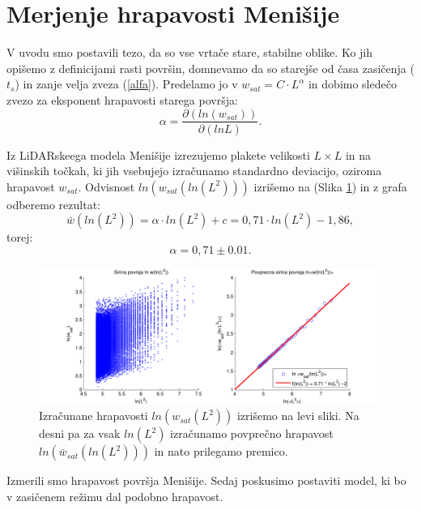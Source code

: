 \documentclass[a4paper, twoside, 12pt]{book}
\begin{document}
\section{Merjenje hrapavosti Menišije}
\label{hrapavost}

V uvodu smo postavili tezo, da so vse vrtače stare, stabilne oblike. Ko jih opišemo z definicijami rasti površin, domnevamo da so starejše od časa zasičenja ($t_s$) in zanje velja zveza (\ref{alfa}). Predelamo jo v $ w_{sat}=C \cdot L^\alpha $ in dobimo sledečo zvezo za eksponent hrapavosti starega površja:
    \begin{equation}
      \alpha = \frac{\partial ( ln (w_{sat}) ) }{\partial ( ln L )}.
      \label{alpha-numeric}
    \end{equation}

Iz LiDARskeega modela Menišije izrezujemo plakete velikosti $L\times L$ in na višinskih točkah, ki jih vsebujejo izračunamo standardno deviacijo, oziroma hrapavost ${w}_{sat}$. Odvisnost $ln(w_{sat}(ln(L^2)))$ izrišemo na (Slika \ref{fig:menisija-alfa}) in z grafa odberemo rezultat:
\begin{equation}
  \bar w(ln(L^2)) = \alpha \cdot ln(L^2) + c = 0,71 \cdot  ln(L^2) - 1,86,
\end{equation}
torej:
\begin{equation}
  \alpha =  0,71 \pm 0.01.
\end{equation}
\begin{figure}[h!]
  \begin{center}
    \includegraphics[width=14.5cm]{slike/menisija-alfa-3d.pdf}
  \end{center}
  \caption{Izračunane hrapavosti $ln({w}_{sat}(L^2))$ izrišemo na levi sliki. Na desni pa za vsak $ln(L^2)$ izračunamo povprečno hrapavost $ln(\bar w_{sat}(ln(L^2)))$ in nato prilegamo premico.}
  \label{fig:menisija-alfa}
\end{figure}

Izmerili smo hrapavost površja Menišije. Sedaj poskusimo postaviti model, ki bo v zasičenem režimu dal podobno hrapavost.
\end{document}
